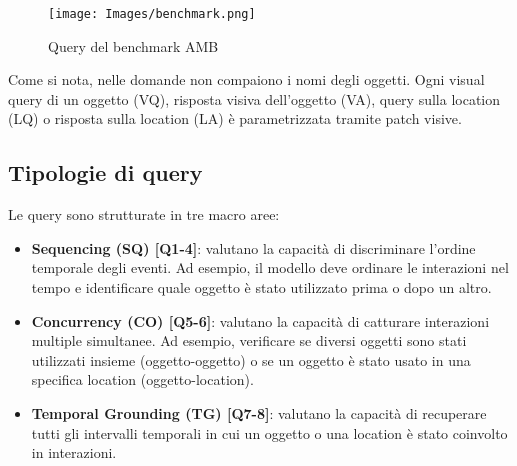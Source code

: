 \begin{figure}[ht]
    \centering
    \texttt{[image: Images/benchmark.png]}
    \caption{Query del benchmark AMB}
    \label{fig:benchmark_queries}
\end{figure}

Come si nota, nelle domande non compaiono i nomi degli oggetti. Ogni visual query di un oggetto (VQ), risposta visiva dell'oggetto (VA), query sulla location (LQ) o risposta sulla location (LA) è parametrizzata tramite patch visive.

\subsection*{Tipologie di query}

Le query sono strutturate in tre macro aree:
\begin{itemize}
    \item \textbf{\textcolor{sqcolor}{Sequencing (SQ) [Q1-4]}}: valutano la capacità di discriminare l'ordine temporale degli eventi. Ad esempio, il modello deve ordinare le interazioni nel tempo e identificare quale oggetto è stato utilizzato prima o dopo un altro.
    
    \item \textbf{\textcolor{cocolor}{Concurrency (CO) [Q5-6]}}: valutano la capacità di catturare interazioni multiple simultanee. Ad esempio, verificare se diversi oggetti sono stati utilizzati insieme (oggetto-oggetto) o se un oggetto è stato usato in una specifica location (oggetto-location).
    
    \item \textbf{\textcolor{tgcolor}{Temporal Grounding (TG) [Q7-8]}}: valutano la capacità di recuperare tutti gli intervalli temporali in cui un oggetto o una location è stato coinvolto in interazioni.
\end{itemize}

